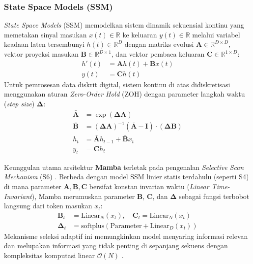 \subsubsection{State Space Models (SSM)}
\textit{State Space Models} (SSM) memodelkan sistem dinamik sekuensial kontinu yang memetakan sinyal masukan $x(t) \in \mathbb{R}$ ke keluaran $y(t) \in \mathbb{R}$ melalui variabel keadaan laten tersembunyi $h(t) \in \mathbb{R}^D$ dengan matriks evolusi $\mathbf{A} \in \mathbb{R}^{D \times D}$, vektor proyeksi masukan $\mathbf{B} \in \mathbb{R}^{D \times 1}$, dan vektor pembaca keluaran $\mathbf{C} \in \mathbb{R}^{1 \times D}$:
\begin{equation}
	\begin{aligned}
		h'(t) &= \mathbf{A} h(t) + \mathbf{B} x(t) \\
		y(t) &= \mathbf{C} h(t)
	\end{aligned}
\end{equation}
Untuk pemrosesan data diskrit digital, sistem kontinu di atas didiskretisasi menggunakan aturan \textit{Zero-Order Hold} (ZOH) dengan parameter langkah waktu (\textit{step size}) $\mathbf{\Delta}$:
\begin{equation}
	\begin{aligned}
		\mathbf{\bar{A}} &= \exp(\mathbf{\Delta} \mathbf{A}) \\
		\mathbf{\bar{B}} &= (\mathbf{\Delta} \mathbf{A})^{-1} (\mathbf{\bar{A}} - \mathbf{I}) \cdot (\mathbf{\Delta} \mathbf{B}) \\
		h_t &= \mathbf{\bar{A}} h_{t-1} + \mathbf{\bar{B}} x_t \\
		y_t &= \mathbf{C} h_t
	\end{aligned}
\end{equation}

Keunggulan utama arsitektur \textbf{Mamba} terletak pada pengenalan \textit{Selective Scan Mechanism} (S6) \cite{gu2024mamba}. Berbeda dengan model SSM linier statis terdahulu (seperti S4) di mana parameter $\mathbf{A}, \mathbf{B}, \mathbf{C}$ bersifat konstan invarian waktu (\textit{Linear Time-Invariant}), Mamba merumuskan parameter $\mathbf{B}$, $\mathbf{C}$, dan $\mathbf{\Delta}$ sebagai fungsi terbobot langsung dari token masukan $x_t$:
\begin{equation}
	\begin{aligned}
		\mathbf{B}_t &= \text{Linear}_N(x_t), \quad \mathbf{C}_t = \text{Linear}_N(x_t) \\
		\mathbf{\Delta}_t &= \text{softplus}(\text{Parameter} + \text{Linear}_D(x_t))
	\end{aligned}
\end{equation}
Mekanisme seleksi adaptif ini memungkinkan model menyaring informasi relevan dan melupakan informasi yang tidak penting di sepanjang sekuens dengan kompleksitas komputasi linear $\mathcal{O}(N)$ \cite{gu2024mamba}.

